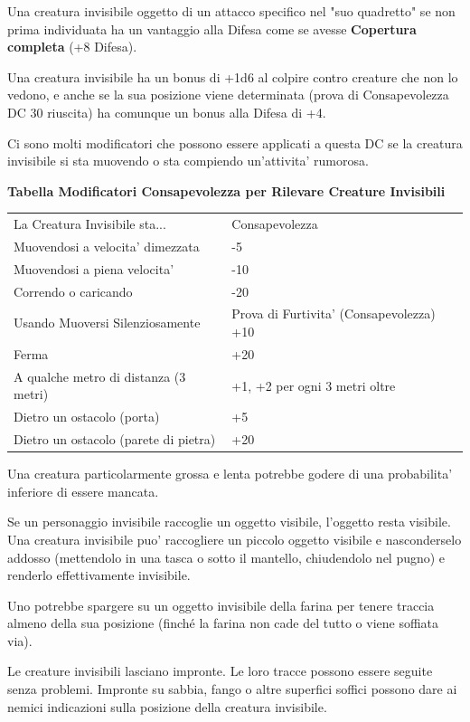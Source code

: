 \documentclass[a4paper,11pt,twoside,openany]{book}
\begin{document}
Una creatura invisibile oggetto di un attacco specifico nel "suo quadretto" se non prima individuata ha un vantaggio alla Difesa come se avesse \textbf{Copertura completa} (+8 Difesa).

Una creatura invisibile ha un bonus di +1d6 al colpire contro creature che non lo vedono, e anche se la sua posizione viene determinata (prova di Consapevolezza DC 30 riuscita) ha comunque un bonus alla Difesa di +4.

Ci sono molti modificatori che possono essere applicati a questa DC se la creatura invisibile si sta muovendo o sta compiendo un'attivita' rumorosa.

\bigskip

\textbf{Tabella Modificatori Consapevolezza per Rilevare Creature Invisibili}

\medskip

\begin{tabular}{ll}
\toprule
La Creatura Invisibile sta... & Consapevolezza\tabularnewline
Muovendosi a velocita' dimezzata & -5\tabularnewline
Muovendosi a piena velocita' & -10\tabularnewline
Correndo o caricando & -20\tabularnewline
Usando Muoversi Silenziosamente & Prova di Furtivita' (Consapevolezza) +10\tabularnewline
Ferma & +20\tabularnewline
A qualche metro di distanza (3 metri) & +1, +2 per ogni 3 metri oltre\tabularnewline
Dietro un ostacolo (porta) & +5\tabularnewline
Dietro un ostacolo (parete di pietra) & +20\tabularnewline

\end{tabular}

\bigskip

Una creatura particolarmente grossa e lenta potrebbe godere di una probabilita' inferiore di essere mancata.

Se un personaggio invisibile raccoglie un oggetto visibile, l'oggetto resta visibile. Una creatura invisibile puo' raccogliere un piccolo oggetto visibile e nasconderselo addosso (mettendolo in una tasca o sotto il mantello, chiudendolo nel pugno) e renderlo effettivamente invisibile.

Uno potrebbe spargere su un oggetto invisibile della farina per tenere traccia almeno della sua posizione (finché la farina non cade del tutto o viene soffiata via).

Le creature invisibili lasciano impronte. Le loro tracce possono essere seguite senza problemi. Impronte su sabbia, fango o altre superfici soffici possono dare ai nemici indicazioni sulla posizione della creatura invisibile.
\end{document}
